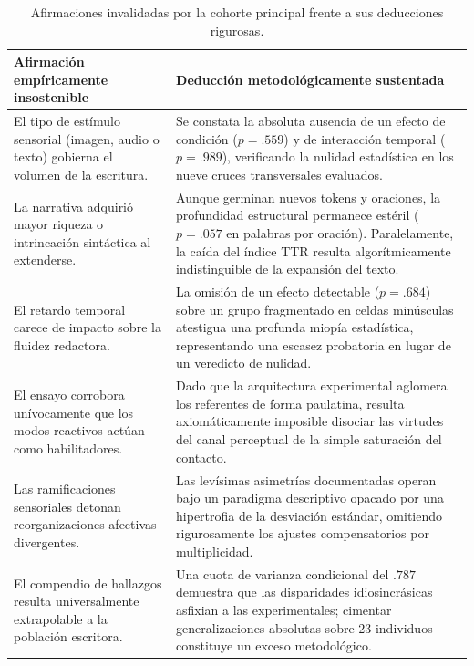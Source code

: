 \documentclass[12pt]{article}
\begin{document}
	\begin{table}[htbp]
		\centering
		\caption{Afirmaciones invalidadas por la cohorte principal frente a sus deducciones rigurosas.}
		\label{tab:no_sostener_principal}
		\small
		\begin{tabular}{p{} p{}}
			\toprule
			\textbf{Afirmación empíricamente insostenible} & \textbf{Deducción metodológicamente sustentada} \\
			\midrule
			El tipo de estímulo sensorial (imagen, audio o texto) gobierna el volumen de la escritura. &
			Se constata la absoluta ausencia de un efecto de condición ($p = .559$) y de interacción temporal ($p = .989$), verificando la nulidad estadística en los nueve cruces transversales evaluados. \\[4pt]
			La narrativa adquirió mayor riqueza o intrincación sintáctica al extenderse. &
			Aunque germinan nuevos tokens y oraciones, la profundidad estructural permanece estéril ($p = .057$ en palabras por oración). Paralelamente, la caída del índice TTR resulta algorítmicamente indistinguible de la expansión del texto. \\[4pt]
			El retardo temporal carece de impacto sobre la fluidez redactora. &
			La omisión de un efecto detectable ($p = .684$) sobre un grupo fragmentado en celdas minúsculas atestigua una profunda miopía estadística, representando una escasez probatoria en lugar de un veredicto de nulidad. \\[4pt]
			El ensayo corrobora unívocamente que los modos reactivos actúan como habilitadores. &
			Dado que la arquitectura experimental aglomera los referentes de forma paulatina, resulta axiomáticamente imposible disociar las virtudes del canal perceptual de la simple saturación del contacto. \\[4pt]
			Las ramificaciones sensoriales detonan reorganizaciones afectivas divergentes. &
			Las levísimas asimetrías documentadas operan bajo un paradigma descriptivo opacado por una hipertrofia de la desviación estándar, omitiendo rigurosamente los ajustes compensatorios por multiplicidad. \\[4pt]
			El compendio de hallazgos resulta universalmente extrapolable a la población escritora. &
			Una cuota de varianza condicional del $.787$ demuestra que las disparidades idiosincrásicas asfixian a las experimentales; cimentar generalizaciones absolutas sobre 23 individuos constituye un exceso metodológico. \\
			\bottomrule
		\end{tabular}
	\end{table}
\end{document}
